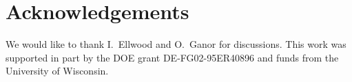 \documentclass[12pt]{article}
\begin{document}
\section*{Acknowledgements}
%
We would like to thank
%
I.~Ellwood and 
O.~Ganor
%
for discussions.
%
This work was supported in part by the DOE grant DE-FG02-95ER40896 and
funds from the University of Wisconsin.





\end{document}

